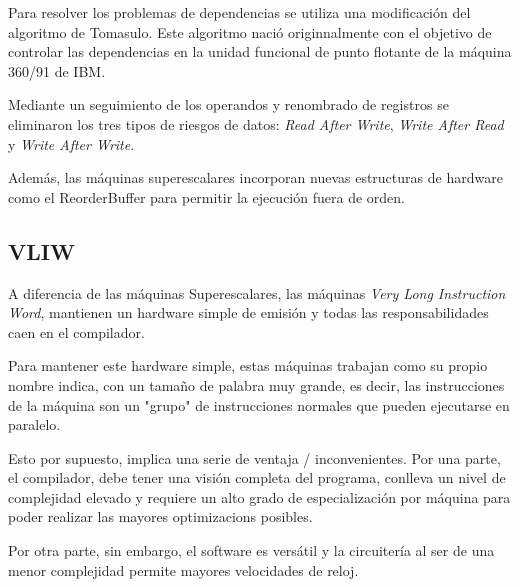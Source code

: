 \bigskip
Para resolver los problemas de dependencias se utiliza una modificación del algoritmo de Tomasulo.
Este algoritmo nació originnalmente con el objetivo de controlar las dependencias en la unidad
funcional de punto flotante de la máquina 360/91 de IBM.

\bigskip
Mediante un seguimiento de los operandos y renombrado de registros se eliminaron los tres tipos 
de riesgos de datos: \textit{Read After Write}, \textit{Write After Read} y \textit{Write After Write}. 

\bigskip
Además, las máquinas superescalares incorporan nuevas estructuras de hardware como el ReorderBuffer para
permitir la ejecución fuera de orden.

\subsection{VLIW}

A diferencia de las máquinas Superescalares, las máquinas \textit{Very Long Instruction Word},
mantienen un hardware simple de emisión y todas las responsabilidades caen en el compilador.

\bigskip
Para mantener este hardware simple, estas máquinas trabajan como su propio nombre indica, con
un tamaño de palabra muy grande, es decir, las instrucciones de la máquina son un "grupo"
de instrucciones normales que pueden ejecutarse en paralelo.

\bigskip
Esto por supuesto, implica una serie de ventaja / inconvenientes. Por una parte, el compilador,
debe tener una visión completa del programa, conlleva un nivel de complejidad elevado y requiere
un alto grado de especialización por máquina para poder realizar las mayores optimizacions posibles.

\bigskip
Por otra parte, sin embargo, el software es versátil y la circuitería al ser de una menor complejidad 
permite mayores velocidades de reloj.